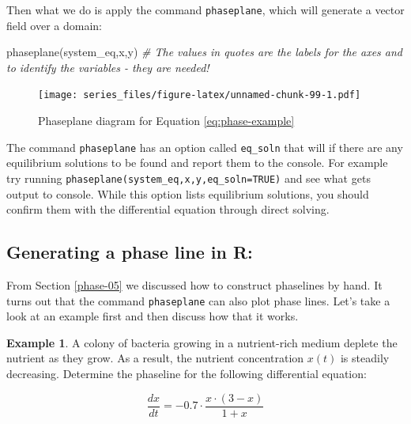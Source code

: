 \documentclass[
]{book}
\newenvironment{Shaded}{\begin{snugshade}}{\end{snugshade}}
\newcommand{\CommentTok}[1]{\textcolor[rgb]{0.56,0.35,0.01}{\textit{#1}}}
\newcommand{\FunctionTok}[1]{\textcolor[rgb]{0.00,0.00,0.00}{#1}}
\newcommand{\NormalTok}[1]{#1}
\newcommand{\StringTok}[1]{\textcolor[rgb]{0.31,0.60,0.02}{#1}}
\theoremstyle{definition}
\theoremstyle{definition}
\newtheorem{example}{Example}[chapter]
\theoremstyle{definition}
\theoremstyle{remark}
\begin{document}
Then what we do is apply the command \texttt{phaseplane}, which will generate a vector field over a domain:

\begin{Shaded}
\begin{Highlighting}[]
\FunctionTok{phaseplane}\NormalTok{(system\_eq,}\StringTok{\textquotesingle{}x\textquotesingle{}}\NormalTok{,}\StringTok{\textquotesingle{}y\textquotesingle{}}\NormalTok{)  }\CommentTok{\# The values in quotes are the labels for the axes and to identify the variables {-} they are needed!}
\end{Highlighting}
\end{Shaded}

\begin{figure}
\centering
\texttt{[image: series\_files/figure-latex/unnamed-chunk-99-1.pdf]}
\caption{\label{fig:unnamed-chunk-99}Phaseplane diagram for Equation \eqref{eq:phase-example}}
\end{figure}

The command \texttt{phaseplane} has an option called \texttt{eq\_soln} that will if there are any equilibrium solutions to be found and report them to the console. For example try running \texttt{phaseplane(system\_eq,\textquotesingle{}x\textquotesingle{},\textquotesingle{}y\textquotesingle{},eq\_soln=TRUE)} and see what gets output to console. While this option lists equilibrium solutions, you should confirm them with the differential equation through direct solving.

\hypertarget{generating-a-phase-line-in-r}{%
\subsection{Generating a phase line in R:}\label{generating-a-phase-line-in-r}}

From Section \ref{phase-05} we discussed how to construct phaselines by hand. It turns out that the command \texttt{phaseplane} can also plot phase lines. Let's take a look at an example first and then discuss how that it works.

\begin{example}
\protect\hypertarget{exm:unnamed-chunk-100}{}{\label{exm:unnamed-chunk-100} }A colony of bacteria growing in a nutrient-rich medium deplete the nutrient as they grow. As a result, the nutrient concentration \(x(t)\) is steadily decreasing. Determine the phaseline for the following differential equation:

\begin{equation}\label{eq:bacteria-colony}
\frac{dx}{dt} = - 0.7 \cdot \frac{x \cdot (3- x)}{1 + x}
\end{equation}
\end{example}
\end{document}
